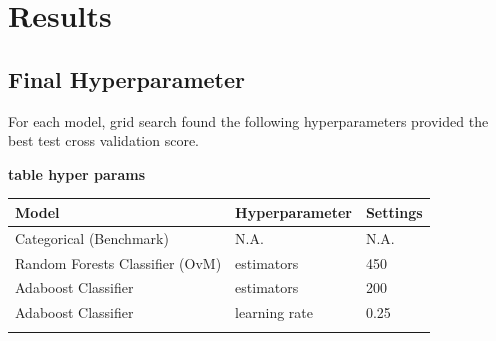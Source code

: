 \documentclass{bioinfo}
\begin{document}

\section{Results}

\subsection{Final Hyperparameter}
For each model, grid search found the following hyperparameters provided the best test cross validation score.

\textbf{table hyper params }


\begin{table}[!h]
 {\begin{tabular}{@{}lll@{}}\toprule Model  & Hyperparameter & Settings \\\midrule
Categorical (Benchmark) & N.A. &  N.A.   \\
Random Forests Classifier (OvM)& estimators & 450 \\
Adaboost Classifier & estimators & 200 \\
Adaboost Classifier & learning rate & 0.25 \\\botrule
\end{tabular}}{}
\end{table}

\end{document}
